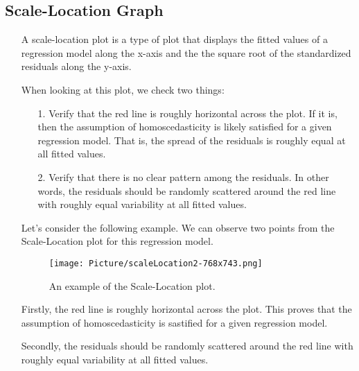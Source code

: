 \documentclass[a4paper]{article}
\begin{document}
\subsection{Scale-Location Graph}
\begin{itemize}
    \item[] A scale-location plot is a type of plot that displays the fitted values of a regression model along the x-axis and the the square root of the standardized residuals along the y-axis.
    
    \item[] When looking at this plot, we check two things:
    \begin{itemize}
        \item[1.] Verify that the red line is roughly horizontal across the plot. If it is, then the assumption of homoscedasticity is likely satisfied for a given regression model. That is, the spread of the residuals is roughly equal at all fitted values.
        
        \item[2.] Verify that there is no clear pattern among the residuals. In other words, the residuals should be randomly scattered around the red line with roughly equal variability at all fitted values.
    \end{itemize}
    
    \item[] Let's consider the following example. We can observe two points from the Scale-Location plot for this regression model.
    
    \begin{figure}[H]
        \centering
        \texttt{[image: Picture/scaleLocation2-768x743.png]}
        \caption{An example of the Scale-Location plot.}
        \label{6.6.1}
    \end{figure}
    
    \item[] Firstly, the red line is roughly horizontal across the plot. This proves that the assumption of homoscedasticity is sastified for a given regression model.
    
    \item[] Secondly, the residuals should be randomly scattered around the red line with roughly equal variability at all fitted values.
\end{itemize}
\end{document}
